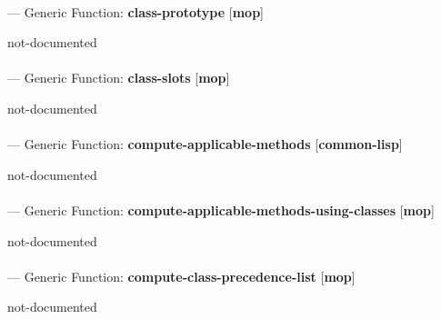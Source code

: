 \paragraph{}
\label{MOP:CLASS-PROTOTYPE}
--- Generic Function: \textbf{class-prototype} [\textbf{mop}] \textit{}

\begin{adjustwidth}{5em}{5em}
not-documented
\end{adjustwidth}

\paragraph{}
\label{MOP:CLASS-SLOTS}
--- Generic Function: \textbf{class-slots} [\textbf{mop}] \textit{}

\begin{adjustwidth}{5em}{5em}
not-documented
\end{adjustwidth}

\paragraph{}
\label{COMMON-LISP:COMPUTE-APPLICABLE-METHODS}
--- Generic Function: \textbf{compute-applicable-methods} [\textbf{common-lisp}] \textit{}

\begin{adjustwidth}{5em}{5em}
not-documented
\end{adjustwidth}

\paragraph{}
\label{MOP:COMPUTE-APPLICABLE-METHODS-USING-CLASSES}
--- Generic Function: \textbf{compute-applicable-methods-using-classes} [\textbf{mop}] \textit{}

\begin{adjustwidth}{5em}{5em}
not-documented
\end{adjustwidth}

\paragraph{}
\label{MOP:COMPUTE-CLASS-PRECEDENCE-LIST}
--- Generic Function: \textbf{compute-class-precedence-list} [\textbf{mop}] \textit{}

\begin{adjustwidth}{5em}{5em}
not-documented
\end{adjustwidth}

